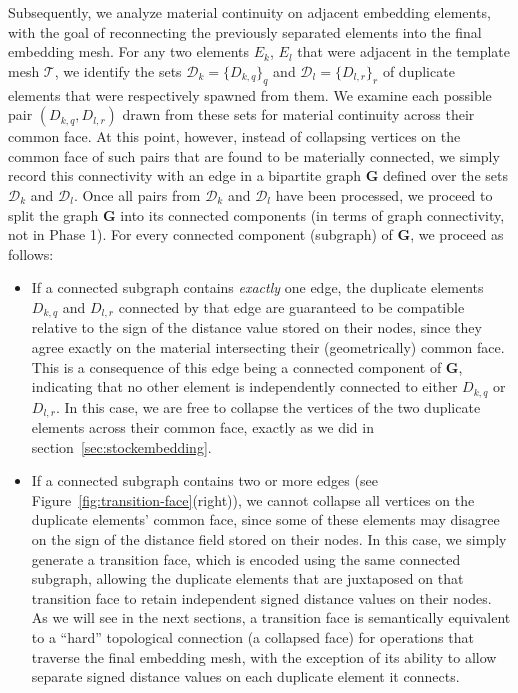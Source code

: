 Subsequently, we analyze material continuity on adjacent embedding
elements, with the goal of reconnecting the previously separated
elements into the final embedding mesh. For any two elements $E_k$,
$E_l$ that were adjacent in the template mesh $\mathcal{T}$, we
identify the sets $\mathcal{D}_k=\{D_{k,q}\}_q$ and
$\mathcal{D}_l=\{D_{l,r}\}_r$ of duplicate elements that were
respectively spawned from them. We examine each possible pair
$(D_{k,q}, D_{l,r})$ drawn from these sets for material continuity
across their common face. At this point, however, instead of
collapsing vertices on the common face of such pairs that are found to
be materially connected, we simply record this connectivity with an
edge in a bipartite graph $\mathbf{G}$ defined over the sets
$\mathcal{D}_k$ and $\mathcal{D}_l$. Once all pairs from
$\mathcal{D}_k$ and $\mathcal{D}_l$ have been processed, we proceed to
split the graph $\mathbf{G}$ into its connected components (in terms
of graph connectivity, not in Phase 1). For
every connected component (subgraph) of $\mathbf{G}$, we proceed as
follows:
\begin{itemize}

\item If a connected subgraph contains \emph{exactly} one edge, the
  duplicate elements $D_{k,q}$ and $D_{l,r}$ connected by that edge
  are guaranteed to be compatible relative to the sign of the distance
  value stored on their nodes, since they agree exactly on the
  material intersecting their (geometrically) common face. This is a
  consequence of this edge being a connected component of
  $\mathbf{G}$, indicating that no other element is independently
  connected to either $D_{k,q}$ or $D_{l,r}$. In this case, we are
  free to collapse the vertices of the two duplicate elements across
  their common face, exactly as we did in
  section~\ref{sec:stockembedding}. 
\item If a connected subgraph contains two or more edges (see
  Figure~\ref{fig:transition-face}(right)), we cannot collapse all
  vertices on the duplicate elements' common face, since some of these
  elements may disagree on the sign of the distance field stored on
  their nodes. In this case, we simply generate a transition face,
  which is encoded using the same connected subgraph, allowing the
  duplicate elements that are juxtaposed on that transition face to
  retain independent signed distance values on their nodes.  As we
  will see in the next sections, a transition face is semantically
  equivalent to a ``hard'' topological connection (a collapsed face)
  for operations that traverse the final embedding mesh, with the
  exception of its ability to allow separate signed distance values on
  each duplicate element it connects.
\end{itemize}


